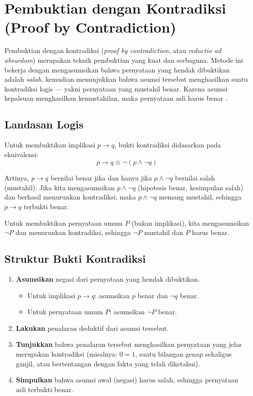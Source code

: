 \section{Pembuktian dengan Kontradiksi (Proof by Contradiction)}

Pembuktian dengan kontradiksi (\textit{proof by contradiction}, atau \textit{reductio ad absurdum}) merupakan teknik pembuktian yang kuat dan serbaguna. Metode ini bekerja dengan mengasumsikan bahwa pernyataan yang hendak dibuktikan adalah \emph{salah}, kemudian menunjukkan bahwa asumsi tersebut menghasilkan suatu kontradiksi logis --- yakni pernyataan yang mustahil benar. Karena asumsi kepalsuan menghasilkan kemustahilan, maka pernyataan asli harus benar \cite{hammack2018}.

\subsection{Landasan Logis}

Untuk membuktikan implikasi $p \rightarrow q$, bukti kontradiksi didasarkan pada ekuivalensi:
\[ p \rightarrow q \equiv \neg(p \wedge \neg q) \]

Artinya, $p \rightarrow q$ bernilai benar jika dan hanya jika $p \wedge \neg q$ bernilai salah (mustahil). Jika kita mengasumsikan $p \wedge \neg q$ (hipotesis benar, kesimpulan salah) dan berhasil menurunkan kontradiksi, maka $p \wedge \neg q$ memang mustahil, sehingga $p \rightarrow q$ terbukti benar.

Untuk membuktikan pernyataan umum $P$ (bukan implikasi), kita mengasumsikan $\neg P$ dan menurunkan kontradiksi, sehingga $\neg P$ mustahil dan $P$ harus benar.

\subsection{Struktur Bukti Kontradiksi}

\begin{enumerate}
    \item \textbf{Asumsikan} negasi dari pernyataan yang hendak dibuktikan.
    \begin{itemize}
        \item Untuk implikasi $p \rightarrow q$: asumsikan $p$ benar dan $\neg q$ benar.
        \item Untuk pernyataan umum $P$: asumsikan $\neg P$ benar.
    \end{itemize}
    \item \textbf{Lakukan} penalaran deduktif dari asumsi tersebut.
    \item \textbf{Tunjukkan} bahwa penalaran tersebut menghasilkan pernyataan yang jelas merupakan kontradiksi (misalnya: $0 = 1$, suatu bilangan genap sekaligus ganjil, atau bertentangan dengan fakta yang telah diketahui).
    \item \textbf{Simpulkan} bahwa asumsi awal (negasi) harus salah, sehingga pernyataan asli terbukti benar.
\end{enumerate}


